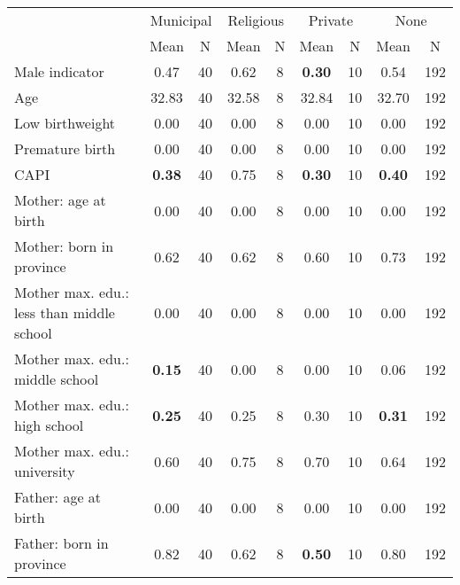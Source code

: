 \begin{tabular}{l c c c c c c c c}
\toprule
& \multicolumn{2}{c}{Municipal} & \multicolumn{2}{c}{Religious} & \multicolumn{2}{c}{Private} & \multicolumn{2}{c}{None} \\
& \scriptsize Mean & \scriptsize N & \scriptsize Mean & \scriptsize N & \scriptsize Mean & \scriptsize N & \scriptsize Mean & \scriptsize N \\
\midrule
Male indicator &      0.47 &        40 &      0.62 &         8 & \textbf{     0.30} &        10 &      0.54 &       192 \\
Age &     32.83 &        40 &     32.58 &         8 &     32.84 &        10 &     32.70 &       192 \\
Low birthweight &      0.00 &        40 &      0.00 &         8 &      0.00 &        10 &      0.00 &       192 \\
Premature birth &      0.00 &        40 &      0.00 &         8 &      0.00 &        10 &      0.00 &       192 \\
CAPI & \textbf{     0.38} &        40 &      0.75 &         8 & \textbf{     0.30} &        10 & \textbf{     0.40} &       192 \\
Mother: age at birth &      0.00 &        40 &      0.00 &         8 &      0.00 &        10 &      0.00 &       192 \\
Mother: born in province &      0.62 &        40 &      0.62 &         8 &      0.60 &        10 &      0.73 &       192 \\
Mother max. edu.: less than middle school &      0.00 &        40 &      0.00 &         8 &      0.00 &        10 &      0.00 &       192 \\
Mother max. edu.: middle school & \textbf{     0.15} &        40 &      0.00 &         8 &      0.00 &        10 &      0.06 &       192 \\
Mother max. edu.: high school & \textbf{     0.25} &        40 &      0.25 &         8 &      0.30 &        10 & \textbf{     0.31} &       192 \\
Mother max. edu.: university &      0.60 &        40 &      0.75 &         8 &      0.70 &        10 &      0.64 &       192 \\
Father: age at birth &      0.00 &        40 &      0.00 &         8 &      0.00 &        10 &      0.00 &       192 \\
Father: born in province &      0.82 &        40 &      0.62 &         8 & \textbf{     0.50} &        10 &      0.80 &       192 \\

\end{tabular}
